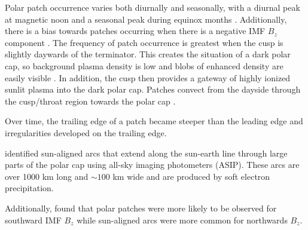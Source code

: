 
Polar patch occurrence varies both diurnally and seasonally, with a diurnal peak at magnetic noon and a seasonal peak during equinox months \citep{Rodger1996}.  Additionally, there is a bias towards patches occurring when there is a negative IMF \(B_z\) component \citep{Buchau1983,Rodger1996}.  The frequency of patch occurrence is greatest when the cusp is slightly daywards of the terminator.  This creates the situation of a dark polar cap, so background plasma density is low and blobs of enhanced density are easily visible \citep{Coley1998}.  In addition, the cusp then provides a gateway of highly ionized sunlit plasma into the dark polar cap.  Patches convect from the dayside through the cusp/throat region towards the polar cap \citep{Kelly1984,Foster1984,Foster1985,Foster1993,Sojka1982,delaBeaujardiere1985}. 



Over time, the trailing edge of a patch became steeper than the leading edge and irregularities developed on the trailing edge.

\citet{Weber1981} identified sun-aligned arcs that extend  along the sun-earth line through large parts of the polar cap using all-sky imaging photometers (ASIP).  These arcs are over 1000 km long and \(\sim100\) km wide and are produced by soft electron precipitation.  

Additionally, \citet{Buchau1983} found that polar patches were more likely to be observed for southward IMF \(B_z\) while sun-aligned arcs were more common for northwards \(B_z\).  


